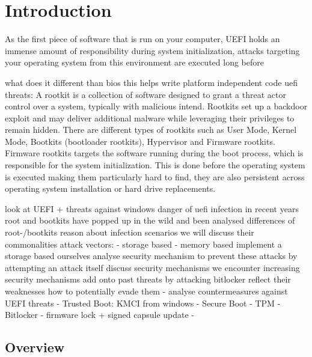 

\chapter{Introduction}


As the first piece of software that is run on your computer, UEFI holds an immense amount of responsibility during system initialization, attacks targeting your operating system from this environment are executed long before

what does it different than bios
this helps write platform independent code
uefi threats:
A rootkit is a collection of software designed to grant a threat actor control over a system, typically with malicious intend.
Rootkits set up a backdoor exploit and may deliver additional malware while leveraging their privileges to remain hidden.
There are different types of rootkits such as User Mode, Kernel Mode, Bootkits (bootloader rootkits), Hypervisor and Firmware rootkits.
\cite{crowdstrike, techtarget}
Firmware rootkits targets the software running during the boot process, which is responsible for the system initialization.
This is done before the operating system is executed making them particularly hard to find, they are also persistent across operating system installation or hard drive replacements.
\cite{crowdstrike}


look at UEFI + threats against windows
danger of uefi infection
in recent years root and bootkits have popped up in the wild and been analysed
differences of root-/bootkits
reason about infection scenarios
we will discuss their commonalities
attack vectors:
- storage based
- memory based
implement a storage based ourselves
analyse security mechanism to prevent these attacks by attempting an attack itself
discuss security mechanisms we encounter
increasing security mechanisms
add onto past threats by attacking bitlocker
reflect their weaknesses
how to potentially evade them
- analyse countermeasures against UEFI threats
- Trusted Boot: KMCI from windows
- Secure Boot
- TPM
- Bitlocker
- firmware lock + signed capsule update
-


\section{Overview}

